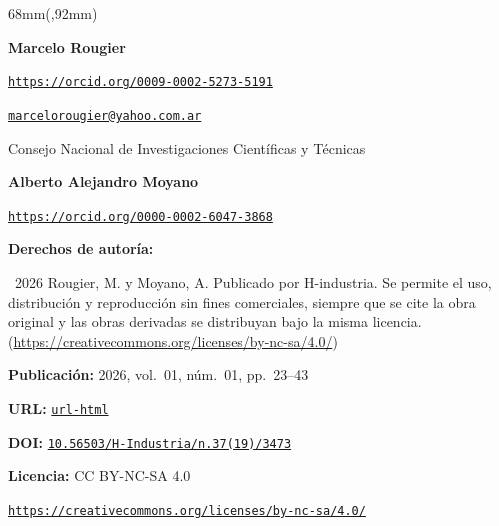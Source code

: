 \documentclass{article}
\newlength{\gbbloquex}
\begin{document}
\begin{textblock*}{68mm}(\gbbloquex,92mm)
{\setlength{\leftskip}{0pt}\setlength{\parindent}{0pt}%
\noindent\begin{minipage}[t]{68mm}
\sffamily\small\setlength{\parskip}{1pt}
{\bfseries\color{azulrevista}Marcelo Rougier}\par
{\scriptsize\texttt{\href{https://orcid.org/0009-0002-5273-5191}{https://orcid.org/0009-0002-5273-5191}}}\par
{\scriptsize\texttt{\href{mailto:marcelorougier@yahoo.com.ar}{marcelorougier@yahoo.com.ar}}}\par
Consejo Nacional de Investigaciones Científicas y Técnicas\par
\vspace{4pt}
{\bfseries\color{azulrevista}Alberto Alejandro Moyano}\par
{\scriptsize\texttt{\href{https://orcid.org/0000-0002-6047-3868}{https://orcid.org/0000-0002-6047-3868}}}\par
\vspace{6pt}
{\bfseries\color{azulrevista!70}Derechos de autor\'ia:}\par
\textcopyright\ 2026 Rougier, M. y Moyano, A. Publicado por H-industria. Se permite el uso, distribución y reproducción sin fines comerciales, siempre que se cite la obra original y las obras derivadas se distribuyan bajo la misma licencia. (\href{https://creativecommons.org/licenses/by-nc-sa/4.0/}{https://creativecommons.org/licenses/by-nc-sa/4.0/})\par\vspace{6pt}
{\bfseries\color{azulrevista!70}Publicación:} 2026, vol.~01, n\'um.~01, pp.~23--43\par\vspace{6pt}
{\bfseries\color{azulrevista!70}URL:} {\scriptsize\texttt{\href{url-html}{url-html}}}\par\vspace{6pt}
{\bfseries\color{azulrevista!70}DOI:} {\scriptsize\texttt{\href{https://doi.org/10.56503/H-Industria/n.37(19)/3473}{10.56503/H-Industria/n.37(19)/3473}}}\par\vspace{6pt}
{\bfseries\color{azulrevista!70}Licencia:} CC BY-NC-SA 4.0\par
{\scriptsize\texttt{\href{https://creativecommons.org/licenses/by-nc-sa/4.0/}{https://creativecommons.org/licenses/by-nc-sa/4.0/}}}\par
\vspace{6pt}

\end{minipage}}
\end{textblock*}
\end{document}
